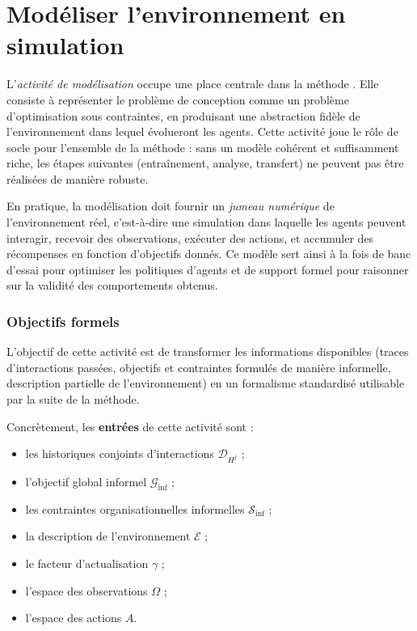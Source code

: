 \clearpage
\thispagestyle{empty}
\null
\newpage


\chapter{Modéliser l'environnement en simulation}
\label{chap:modelling}

L'\textit{activité de modélisation} occupe une place centrale dans la méthode .
Elle consiste à représenter le problème de conception comme un problème d'optimisation sous contraintes, en produisant une abstraction fidèle de l'environnement dans lequel évolueront les agents.
Cette activité joue le rôle de socle pour l'ensemble de la méthode : sans un modèle cohérent et suffisamment riche, les étapes suivantes (entraînement, analyse, transfert) ne peuvent pas être réalisées de manière robuste.

En pratique, la modélisation doit fournir un \textit{jumeau numérique} de l'environnement réel, c'est-à-dire une simulation dans laquelle les agents peuvent interagir, recevoir des observations, exécuter des actions, et accumuler des récompenses en fonction d'objectifs donnés.
Ce modèle sert ainsi à la fois de banc d'essai pour optimiser les politiques d'agents et de support formel pour raisonner sur la validité des comportements obtenus.

\subsection*{Objectifs formels}
L'objectif de cette activité est de transformer les informations disponibles (traces d'interactions passées, objectifs et contraintes formulés de manière informelle, description partielle de l'environnement) en un formalisme standardisé utilisable par la suite de la méthode.

Concrètement, les \textbf{entrées} de cette activité sont :
\begin{itemize}
  \item les historiques conjoints d'interactions $\mathcal{D}_{H^j}$ ;
  \item l'objectif global informel $\mathcal{G}_{\text{inf}}$ ;
  \item les contraintes organisationnelles informelles $\mathcal{S}_{\text{inf}}$ ;
  \item la description de l'environnement $\mathcal{E}$ ;
  \item le facteur d'actualisation $\gamma$ ;
  \item l'espace des observations $\Omega$ ;
  \item l'espace des actions $A$.
\end{itemize}

